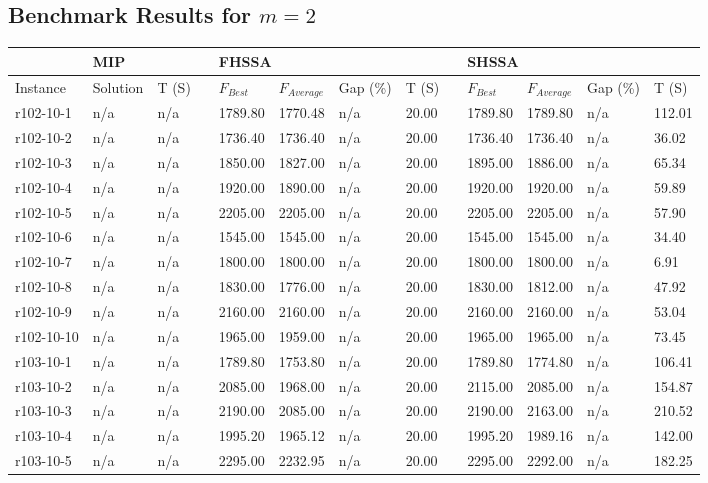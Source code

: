 \documentclass[final,5p,times,twocolumn]{elsarticle}
\begin{document}
{{{{{{{{{{{{{\subsection{Benchmark Results for $m=2$}
\begin{longtable}{l l l l l l l l l l l l l}
\hline
& \multicolumn{2}{l}{MIP}&&\multicolumn{4}{l}{FHSSA}&& \multicolumn{4}{l}{SHSSA}\\
\hline
Instance & Solution & T (S) & & $F_{Best}$ & $F_{Average}$  & Gap (\%) & T (S) & & $F_{Best}$ & $F_{Average}$  & Gap (\%) & T (S)\\
\hline
\endhead
r102-10-1& n/a& n/a&&1789.80& 1770.48& n/a& 20.00&&1789.80& 1789.80& n/a& 112.01\\
r102-10-2& n/a& n/a&&1736.40& 1736.40& n/a& 20.00&&1736.40& 1736.40& n/a& 36.02\\
r102-10-3& n/a& n/a&&1850.00& 1827.00& n/a& 20.00&&1895.00& 1886.00& n/a& 65.34\\
r102-10-4& n/a& n/a&&1920.00& 1890.00& n/a& 20.00&&1920.00& 1920.00& n/a& 59.89\\
r102-10-5& n/a& n/a&&2205.00& 2205.00& n/a& 20.00&&2205.00& 2205.00& n/a& 57.90\\
r102-10-6& n/a& n/a&&1545.00& 1545.00& n/a& 20.00&&1545.00& 1545.00& n/a& 34.40\\
r102-10-7& n/a& n/a&&1800.00& 1800.00& n/a& 20.00&&1800.00& 1800.00& n/a& 6.91\\
r102-10-8& n/a& n/a&&1830.00& 1776.00& n/a& 20.00&&1830.00& 1812.00& n/a& 47.92\\
r102-10-9& n/a& n/a&&2160.00& 2160.00& n/a& 20.00&&2160.00& 2160.00& n/a& 53.04\\
r102-10-10& n/a& n/a&&1965.00& 1959.00& n/a& 20.00&&1965.00& 1965.00& n/a& 73.45\\
r103-10-1& n/a& n/a&&1789.80& 1753.80& n/a& 20.00&&1789.80& 1774.80& n/a& 106.41\\
r103-10-2& n/a& n/a&&2085.00& 1968.00& n/a& 20.00&&2115.00& 2085.00& n/a& 154.87\\
r103-10-3& n/a& n/a&&2190.00& 2085.00& n/a& 20.00&&2190.00& 2163.00& n/a& 210.52\\
r103-10-4& n/a& n/a&&1995.20& 1965.12& n/a& 20.00&&1995.20& 1989.16& n/a& 142.00\\
r103-10-5& n/a& n/a&&2295.00& 2232.95& n/a& 20.00&&2295.00& 2292.00& n/a& 182.25\\

\end{longtable}}}}}}}}}}}}}}
\end{document}
